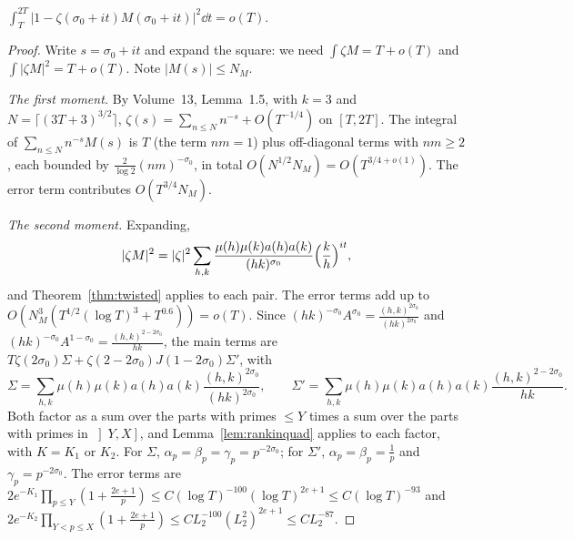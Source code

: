 \begin{proposition}\label{prop:mollmeansq}
$\displaystyle\int_T^{2T}\bigl|1-\zeta(\sigma_0+it)M(\sigma_0+it)\bigr|^2\dd t=o(T)$.
\end{proposition}
\begin{proof}
Write $s=\sigma_0+it$ and expand the square: we need $\int\zeta M=T+o(T)$ and $\int|\zeta M|^2=T+o(T)$. Note $|M(s)|\le N_M$.

\emph{The first moment.} By Volume~13, Lemma~1.5, with $k=3$ and $N=\lceil(3T+3)^{3/2}\rceil$, $\zeta(s)=\sum_{n\le N}n^{-s}+O(T^{-1/4})$ on $[T,2T]$. The integral of $\sum_{n\le N}n^{-s}M(s)$ is $T$ (the term $nm=1$) plus off-diagonal terms with $nm\ge2$, each bounded by $\frac{2}{\log 2}(nm)^{-\sigma_0}$, in total $O(N^{1/2}N_M)=O(T^{3/4+o(1)})$. The error term contributes $O(T^{3/4}N_M)$.

\emph{The second moment.} Expanding,
\[
|\zeta M|^2=|\zeta|^2\sum_{h,k}\frac{\mu(h)\mu(k)a(h)a(k)}{(hk)^{\sigma_0}}\Bigl(\frac kh\Bigr)^{it},
\]
and Theorem~\ref{thm:twisted} applies to each pair. The error terms add up to $O(N_M^3(T^{1/2}(\log T)^3+T^{0.6}))=o(T)$. Since $(hk)^{-\sigma_0}A^{\sigma_0}=\frac{(h,k)^{2\sigma_0}}{(hk)^{2\sigma_0}}$ and $(hk)^{-\sigma_0}A^{1-\sigma_0}=\frac{(h,k)^{2-2\sigma_0}}{hk}$, the main terms are $T\zeta(2\sigma_0)\Sigma+\zeta(2-2\sigma_0)J(1-2\sigma_0)\Sigma'$, with
\[
\Sigma=\sum_{h,k}\mu(h)\mu(k)a(h)a(k)\frac{(h,k)^{2\sigma_0}}{(hk)^{2\sigma_0}},\qquad\Sigma'=\sum_{h,k}\mu(h)\mu(k)a(h)a(k)\frac{(h,k)^{2-2\sigma_0}}{hk}.
\]
Both factor as a sum over the parts with primes $\le Y$ times a sum over the parts with primes in $\left]Y,X\right]$, and Lemma~\ref{lem:rankinquad} applies to each factor, with $K=K_1$ or $K_2$. For $\Sigma$, $\alpha_p=\beta_p=\gamma_p=p^{-2\sigma_0}$; for $\Sigma'$, $\alpha_p=\beta_p=\frac1p$ and $\gamma_p=p^{-2\sigma_0}$. The error terms are $2e^{-K_1}\prod_{p\le Y}(1+\frac{2e+1}p)\le C(\log T)^{-100}(\log T)^{2e+1}\le C(\log T)^{-93}$ and $2e^{-K_2}\prod_{Y<p\le X}(1+\frac{2e+1}p)\le CL_2^{-100}(L_2^2)^{2e+1}\le CL_2^{-87}$.


\end{proof}

